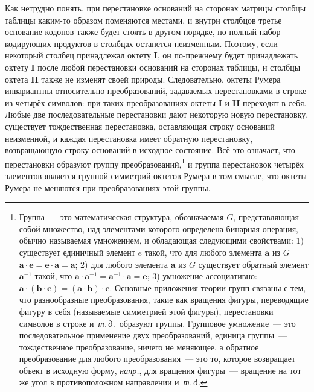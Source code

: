 \documentclass[12pt]{article}
\begin{document}
Как нетрудно понять, при перестановке оснований на сторонах матрицы столбцы таблицы каким-то образом поменяются местами, и внутри столбцов третье основание кодонов также будет стоять в другом порядке, но полный набор кодирующих продуктов в столбцах останется неизменным. Поэтому, если некоторый столбец принадлежал октету \textbf{I}, он по-прежнему будет принадлежать октету \textbf{I} после любой перестановки оснований на сторонах таблицы, и столбцы октета \textbf{II} также не изменят своей природы. Следовательно, октеты Румера инвариантны относительно преобразований, задаваемых перестановками в строке из четырёх символов: при таких преобразованиях октеты \textbf{I} и \textbf{II} переходят в себя. Любые две последовательные перестановки дают некоторую новую перестановку, существует тождественная перестановка, оставляющая строку оснований неизменной, и каждая перестановка имеет обратную перестановку, возвращающую строку оснований в исходное состояние. Всё это означает, что перестановки образуют группу преобразований,\footnote{Группа~--- это математическая структура, обозначаемая $G$, представляющая собой множество, над элементами которого определена бинарная операция, обычно называемая умножением, и обладающая следующими свойствами: 1) существует единичный элемент $e$ такой, что для любого элемента $\boldsymbol{a}$ из $G$\ $\boldsymbol{a} \cdot \boldsymbol{e} = \boldsymbol{e} \cdot \boldsymbol{a} = \boldsymbol{a}$; 2) для любого элемента $\boldsymbol{a}$ из $G$ существует обратный элемент $\boldsymbol{a}^{-1}$ такой, что $\boldsymbol{a} \cdot \boldsymbol{a}^{-1} = \boldsymbol{a}^{-1} \cdot \boldsymbol{a} = \boldsymbol{e}$; 3) умножение ассоциативно: $\boldsymbol{a} \cdot (\boldsymbol{b} \cdot \boldsymbol{c}) = (\boldsymbol{a} \cdot \boldsymbol{b}) \cdot \boldsymbol{c}$. Основные приложения теории групп связаны с тем, что разнообразные преобразования, такие как вращения фигуры, переводящие фигуру в себя (называемые симметрией этой фигуры), перестановки символов в строке и~\textit{т.\,д.}\ образуют группы. Групповое умножение~--- это последовательное применение двух преобразований, единица группы~--- тождественное преобразование, ничего не меняющее, а обратное преобразование для любого преобразования~--- это то, которое возвращает объект в исходную форму, \textit{напр.}, для вращения фигуры~--- вращение на тот же угол в противоположном направлении и~\textit{т.\,д.}} и группа перестановок четырёх элементов является группой симметрий октетов Румера в том смысле, что октеты Румера не меняются при преобразованиях этой группы.
\end{document}
